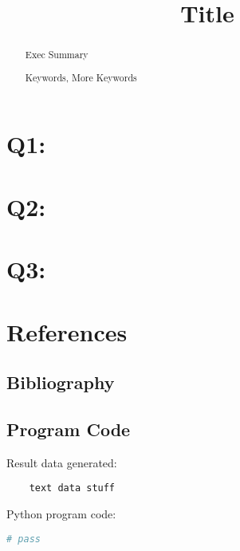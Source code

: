 \documentclass{mcm}
\title{Title}
\numberwithin{figure}{section}
\numberwithin{table}{section}
\numberwithin{equation}{section}
\begin{document}
    \begin{abstract}
        Exec Summary

        \begin{keywords}
            Keywords, More Keywords
        \end{keywords}

    \end{abstract}

    \maketitle
    \tableofcontents
    \newpage


    \section{Q1:}
    

    \section{Q2:}
    

    \section{Q3:}
    

    \section{References}

    \subsection{Bibliography}
    \printbibliography

    \subsection{Program Code}
    \noindent Result data generated:
    \begin{verbatim}
    text data stuff

    \end{verbatim}

    \noindent Python program code:
    \begin{lstlisting}[language=Python,label={lst:code}]
        # pass

    \end{lstlisting}
\end{document}
